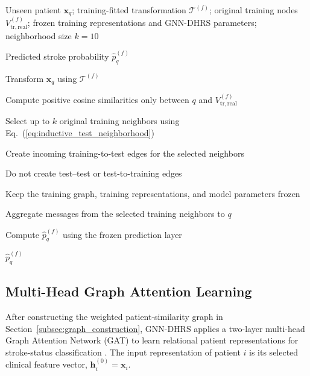 \documentclass[pdflatex,sn-mathphys-num]{sn-jnl}%
\theoremstyle{thmstyleone}%
\theoremstyle{thmstyletwo}%
\theoremstyle{thmstylethree}%
\begin{document}
\begin{algorithm}[!t]
\caption{Leakage-Safe Inductive Inference for an Unseen Patient}
\label{alg:inductive_inference}
\small
\begin{algorithmic}[1]

\Require
Unseen patient \(\mathbf{x}_{q}\);
training-fitted transformation \(\mathcal{T}^{(f)}\);
original training nodes \(V_{\mathrm{tr,real}}^{(f)}\);
frozen training representations and GNN-DHRS parameters;
neighborhood size \(k=10\)

\Ensure
Predicted stroke probability \(\widehat{p}_{q}^{(f)}\)

\State Transform
\(\mathbf{x}_{q}\) using
\(\mathcal{T}^{(f)}\)

\State Compute positive cosine similarities only between \(q\) and
\(V_{\mathrm{tr,real}}^{(f)}\)

\State Select up to \(k\) original training neighbors using
Eq.~(\ref{eq:inductive_test_neighborhood})

\State Create incoming training-to-test edges for the selected neighbors

\State Do not create test--test or test-to-training edges

\State Keep the training graph, training representations, and model
parameters frozen

\State Aggregate messages from the selected training neighbors to \(q\)

\State Compute \(\widehat{p}_{q}^{(f)}\) using the frozen prediction layer

\State \Return \(\widehat{p}_{q}^{(f)}\)

\end{algorithmic}
\end{algorithm}
\endgroup
\subsection{Multi-Head Graph Attention Learning}
\label{subsec:multihead_attention}

After constructing the weighted patient-similarity graph in
Section~\ref{subsec:graph_construction}, GNN-DHRS applies a two-layer
multi-head Graph Attention Network (GAT) to learn relational patient
representations for stroke-status classification
\cite{velickovic2018graph}. The input representation of patient \(i\) is its
selected clinical feature vector,
\(\mathbf{h}_i^{(0)}=\mathbf{x}_i\).
\end{document}

